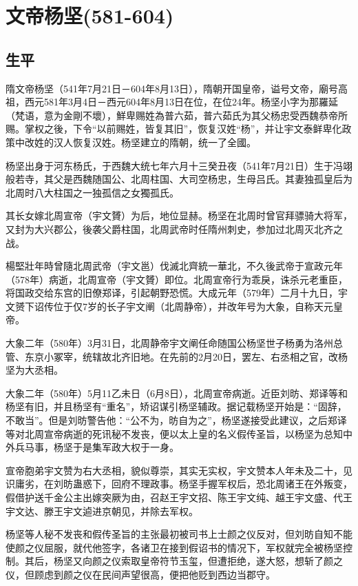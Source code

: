 
\section{文帝杨坚\tiny(581-604)}

\subsection{生平}

隋文帝杨坚（541年7月21日－604年8月13日），隋朝开国皇帝，谥号文帝，廟号高祖，西元581年3月4日－西元604年8月13日在位，在位24年。杨坚小字为那羅延（梵语，意为金剛不壞），鮮卑赐姓為普六茹，普六茹氏为其父杨忠受西魏恭帝所赐。掌权之後，下令“以前赐姓，皆复其旧”，恢复汉姓“杨”，并让宇文泰鲜卑化政策中改姓的汉人恢复汉姓。杨坚建立的隋朝，统一了全國。

杨坚出身于河东杨氏，于西魏大统七年六月十三癸丑夜（541年7月21日）生于冯翊般若寺，其父是西魏随国公、北周柱国、大司空杨忠，生母吕氏。其妻独孤皇后为北周时八大柱国之一独孤信之女獨孤氏。

其长女嫁北周宣帝（宇文贇）为后，地位显赫。杨坚在北周时曾官拜骠骑大将军，又封为大兴郡公，後袭父爵柱国，北周武帝时任隋州刺史，参加过北周灭北齐之战。

楊堅壯年時曾隨北周武帝（宇文邕）伐滅北齊統一華北，不久後武帝于宣政元年（578年）病逝，北周宣帝（宇文贇）即位。北周宣帝行为乖戾，诛杀元老重臣，将国政交给东宫的旧僚郑译，引起朝野恐慌。大成元年（579年）二月十九日，宇文赟下诏传位于仅7岁的长子宇文阐（北周静帝），并改年号为大象，自称天元皇帝。

大象二年（580年）3月31日，北周静帝宇文阐任命随国公杨坚世子杨勇为洛州总管、东京小冢宰，统辖故北齐旧地。在先前的2月20日，罢左、右丞相之官，改杨坚为大丞相。

大象二年（580年）5月11乙未日（6月8日），北周宣帝病逝。近臣刘昉、郑译等和杨坚有旧，并且杨坚有“重名”，矫诏谋引杨坚辅政。据记载杨坚开始是：“固辞，不敢当”。但是刘昉警告他：“公不为，昉自为之”，杨坚遂接受此建议，之后郑译等对北周宣帝病逝的死讯秘不发丧，便以太上皇的名义假传圣旨，以杨坚为总知中外兵马事，杨坚于是集军政大权于一身。

宣帝胞弟宇文赞为右大丞相，貌似尊崇，其实无实权，宇文赞本人年未及二十，见识庸劣，在刘昉蛊惑下，回府不理政事。杨坚手握军权后，恐北周诸王在外叛变，假借护送千金公主出嫁突厥为由，召赵王宇文招、陈王宇文纯、越王宇文盛、代王宇文达、滕王宇文逌进京朝见，并除去军权。

杨坚等人秘不发丧和假传圣旨的主张最初被司书上士颜之仪反对，但刘昉自知不能使颜之仪屈服，就代他签字，各诸卫在接到假诏书的情况下，军权就完全被杨坚控制。其后，杨坚又向颜之仪索取皇帝符节玉玺，但遭拒绝，遂大怒，想斩了颜之仪，但顾虑到颜之仪在民间声望很高，便把他贬到西边当郡守。

